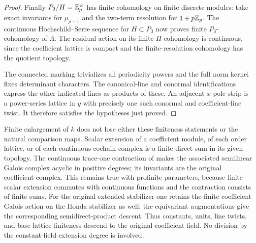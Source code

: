 \begin{proof}
Finally $P_3/H=\mathbb Z_p^\times$ has finite cohomology on finite discrete
modules: take exact invariants for $\mu_{p-1}$ and the two-term
resolution for $1+p\mathbb Z_p$.  The continuous Hochschild--Serre sequence
for $H\subset P_3$ now proves finite $P_3$-cohomology of $\Lambda$.
The residual action on its finite $H$-cohomology is continuous, since
the coefficient lattice is compact and the finite-resolution
cohomology has the quotient topology.

The connected marking trivializes all periodicity powers and the full
norm kernel fixes determinant characters.  The canonical-line and
conormal identifications express the other indicated lines as products
of these.  An adjacent $x$-pole strip is a power-series lattice in $y$
with precisely one such conormal and coefficient-line twist.  It
therefore satisfies the hypotheses just proved.
\end{proof}

\begin{remark}\label{h3:co:constant-descent}
Finite enlargement of $k$ does not lose either these finiteness
statements or the natural comparison maps.  Scalar extension of a
coefficient module, of each order lattice, or of each continuous
cochain complex is a finite direct sum in its given topology.
The continuous trace-one contraction of
 makes the associated semilinear Galois
complex acyclic in positive degrees; its invariants are the original
coefficient complex.  This remains true with profinite parameters,
because finite scalar extension commutes with continuous functions
and the contraction consists of finite sums.
For the original extended stabilizer one retains the finite coefficient
Galois action on the Honda stabilizer as well; the equivariant
augmentations give the corresponding semidirect-product descent.
Thus constants, units, line twists, and base lattice finiteness descend
to the original coefficient field.  No division by the constant-field
extension degree is involved.
\end{remark}
